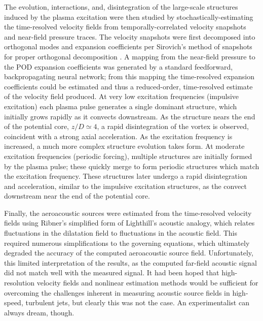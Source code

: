The evolution, interactions, and, disintegration of the large-scale structures induced by the plasma excitation were then studied by stochastically-estimating the time-resolved velocity fields from temporally-correlated velocity snapshots and near-field pressure traces.
The velocity snapshots were first decomposed into orthogonal modes and expansion coefficients per Sirovich's method of snapshots for proper orthogonal decomposition \citep{Sirovich1987}.
A mapping from the near-field pressure to the POD expansion coefficients was generated by a standard feedforward, backpropagating neural network; from this mapping the time-resolved expansion coefficients could be estimated and thus a reduced-order, time-resolved estimate of the velocity field produced.
At very low excitation frequencies (impulsive excitation) each plasma pulse generates a single dominant structure, which initially grows rapidly as it convects downstream. 
As the structure nears the end of the potential core, $z/D \simeq 4$, a rapid disintegration of the vortex is observed, coincident with a strong axial acceleration.
As the excitation frequency is increased, a much more complex structure evolution takes form.
At moderate excitation frequencies (periodic forcing), multiple structures are initially formed by the plasma pulse; these quickly merge to form periodic structures which match the excitation frequency.
These structures later undergo a rapid disintegration and acceleration, similar to the impulsive excitation structures, as the convect downstream near the end of the potential core. 

Finally, the aeroacoustic sources were estimated from the time-resolved velocity fields using Ribner's simplified form of Lighthill's acoustic analogy, which relates fluctuations in the dilatation field to fluctuations in the acoustic field.
This required numerous simplifications to the governing equations, which ultimately degraded the accuracy of the computed aeroacoustic source field.
Unfortunately, this limited interpretation of the results, as the computed far-field acoustic signal did not match well with the measured signal.
It had been hoped that high-resolution velocity fields and nonlinear estimation methods would be sufficient for overcoming the challenges inherent in measuring acoustic source fields in high-speed, turbulent jets, but clearly this was not the case. 
An experimentalist can always dream, though.

